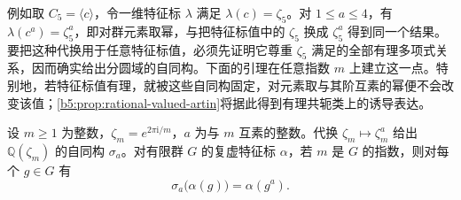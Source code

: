 \ProseParagraphBreak
例如取 \(C_5=\langle c\rangle\)，令一维特征标 \(\lambda\) 满足 \(\lambda(c)=\zeta_5\)。对 \(1\le a\le4\)，有 \(\lambda(c^a)=\zeta_5^a\)，即对群元素取幂，与把特征标值中的 \(\zeta_5\) 换成 \(\zeta_5^a\) 得到同一个结果。要把这种代换用于任意特征标值，必须先证明它尊重 \(\zeta_5\) 满足的全部有理多项式关系，因而确实给出分圆域的自同构。下面的引理在任意指数 \(m\) 上建立这一点。特别地，若特征标值有理，就被这些自同构固定，对元素取与其阶互素的幂便不会改变该值；\cref{b5:prop:rational-valued-artin}将据此得到有理共轭类上的诱导表达。

\begin{lemma}\label{b5:lem:cyclotomic-power-automorphisms}
	设 \(m\ge1\) 为整数，\(\zeta_m=e^{2\pi\mathrm i/m}\)，\(a\) 为与 \(m\) 互素的整数。代换 \(\zeta_m\mapsto\zeta_m^a\) 给出 \(\mathbb Q(\zeta_m)\) 的自同构 \(\sigma_a\)。对有限群 \(G\) 的复虚特征标 \(\alpha\)，若 \(m\) 是 \(G\) 的指数，则对每个 \(g\in G\) 有
	\[
		\sigma_a\bigl(\alpha(g)\bigr)=\alpha(g^a).
	\]
\end{lemma}
